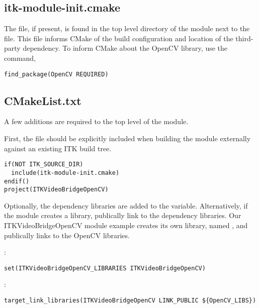 \subsection{itk-module-init.cmake}

The  file, if present, is found in the top level
directory of the module next to the  file. This file
informs CMake of the build configuration and location of the third-party
dependency. To inform CMake about the OpenCV library, use the
 command,

\begin{verbatim}
find_package(OpenCV REQUIRED)
\end{verbatim}


\subsection{CMakeList.txt}

A few additions are required to the top level  of the
module.

First, the  file should be explicitly included
when building the module externally against an existing ITK build tree.

\begin{verbatim}
if(NOT ITK_SOURCE_DIR)
  include(itk-module-init.cmake)
endif()
project(ITKVideoBridgeOpenCV)
\end{verbatim}

Optionally, the dependency libraries are added to the
 variable. Alternatively, if the module creates
a library, publically link to the dependency libraries. Our
ITKVideoBridgeOpenCV module example creates its own library, named
, and publically links to the OpenCV libraries.

:
\begin{verbatim}
set(ITKVideoBridgeOpenCV_LIBRARIES ITKVideoBridgeOpenCV)
\end{verbatim}

:
\begin{verbatim}
target_link_libraries(ITKVideoBridgeOpenCV LINK_PUBLIC ${OpenCV_LIBS})
\end{verbatim}

